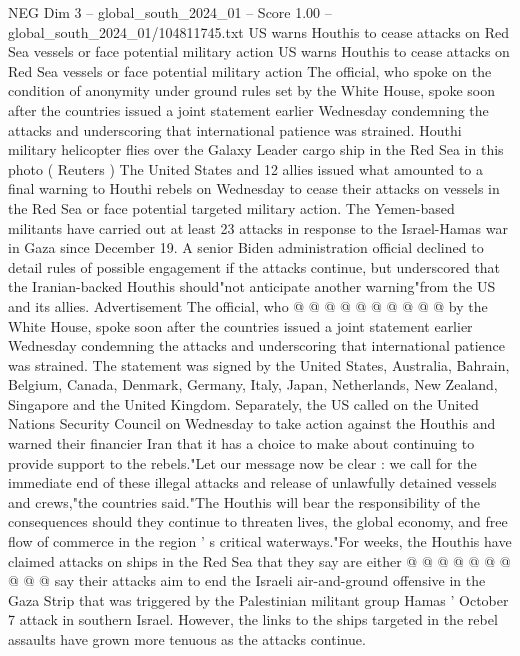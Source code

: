 \begin{textsample}{NEG Dim 3 – global\_south\_2024\_01 – Score 1.00 – global\_south\_2024\_01/104811745.txt}  \label{ex:f3_neg_110}
US warns Houthis to cease attacks on Red Sea vessels or face potential military action US warns Houthis to cease attacks on Red Sea vessels or face potential military action The official, who spoke on the condition of anonymity under ground rules set by the White House, spoke soon after the countries issued a joint statement earlier Wednesday condemning the attacks and underscoring that international patience was strained.
Houthi military helicopter flies over the Galaxy Leader cargo ship in the Red Sea in this photo ( Reuters ) The United States and 12 allies issued what amounted to a final warning to Houthi rebels on Wednesday to cease their attacks on vessels in the Red Sea or face potential targeted military action.
The Yemen-based militants have carried out at least 23 attacks in response to the Israel-Hamas war in Gaza since December 19.
A senior Biden administration official declined to detail rules of possible engagement if the attacks continue, but underscored that the Iranian-backed Houthis should"not anticipate another warning"from the US and its allies.
Advertisement The official, who @ @ @ @ @ @ @ @ @ @ by the White House, spoke soon after the countries issued a joint statement earlier Wednesday condemning the attacks and underscoring that international patience was strained.
The statement was signed by the United States, Australia, Bahrain, Belgium, Canada, Denmark, Germany, Italy, Japan, Netherlands, New Zealand, Singapore and the United Kingdom.
Separately, the US called on the United Nations Security Council on Wednesday to take action against the Houthis and warned their financier Iran that it has a choice to make about continuing to provide support to the rebels."Let our message now be clear : we call for the immediate end of these illegal attacks and release of unlawfully detained vessels and crews,"the countries said."The Houthis will bear the responsibility of the consequences should they continue to threaten lives, the global economy, and free flow of commerce in the region ' s critical waterways."For weeks, the Houthis have claimed attacks on ships in the Red Sea that they say are either @ @ @ @ @ @ @ @ @ @ say their attacks aim to end the Israeli air-and-ground offensive in the Gaza Strip that was triggered by the Palestinian militant group Hamas ' October 7 attack in southern Israel.
However, the links to the ships targeted in the rebel assaults have grown more tenuous as the attacks continue.

\end{textsample}
